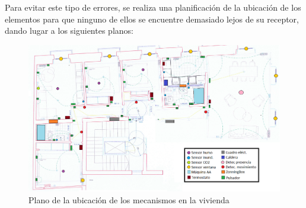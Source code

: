 \vspace{1cm}
Para evitar este tipo de errores, se realiza una planificación de la ubicación de los elementos para que ninguno de ellos se encuentre demasiado lejos de su receptor, dando lugar a los siguientes planos:

\begin{landscape}
\begin{figure}[H]
\includegraphics[width=1.55\textwidth]{figures/plano.png}   
\caption{Plano de la ubicación de los mecanismos en la vivienda}
\label{fig:plano1}
\end{figure}
\end{landscape}

